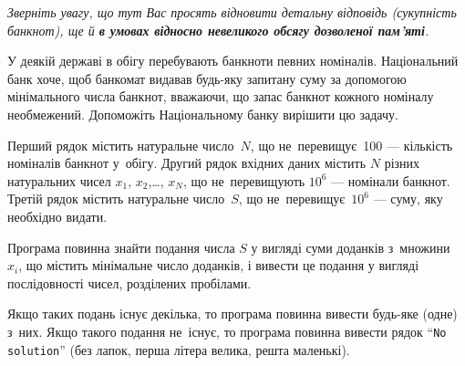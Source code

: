 ﻿{\it
Зверніть увагу, що тут Вас просять відновити детальну відповідь (сукупність банкнот), ще й 
{\bf в умовах відносно невеликого обсягу дозволеної пам'яті}.
}

У деякій державі в обігу перебувають банкноти певних номіналів. 
Національний банк хоче, щоб банкомат видавав будь-яку запитану суму 
за допомогою мінімального числа банкнот, вважаючи, 
що запас банкнот кожного номіналу необмежений. 
Допоможіть Національному банку вирішити цю задачу.

\InputFile
Перший рядок містить натуральне число~$N$, 
що не~перевищує~100 --- кількість номіналів банкнот у~обігу. 
Другий рядок вхідних даних містить $N$ різних натуральних чисел 
$x_1$, $x_2$,\dots, $x_N$, 
що не~перевищують $10^6$ --- номінали банкнот. 
Третій рядок містить натуральне число~$S$, 
що не~перевищує~$10^6$ --- суму, яку необхідно видати.

\OutputFile
Програма повинна знайти подання числа $S$ у вигляді суми 
доданків з~множини~$x_i$, що містить мінімальне число доданків, 
і вивести це подання у вигляді послідовності чисел, розділених пробілами.

Якщо таких подань існує декілька, то програма повинна вивести 
будь-яке (одне) з~них.
Якщо такого подання не~існує, то програма повинна вивести рядок 
``{\tt No solution}'' (без лапок, перша літера велика, решта маленькі).


\Examples
\begin{example}
%
%
\end{example}
